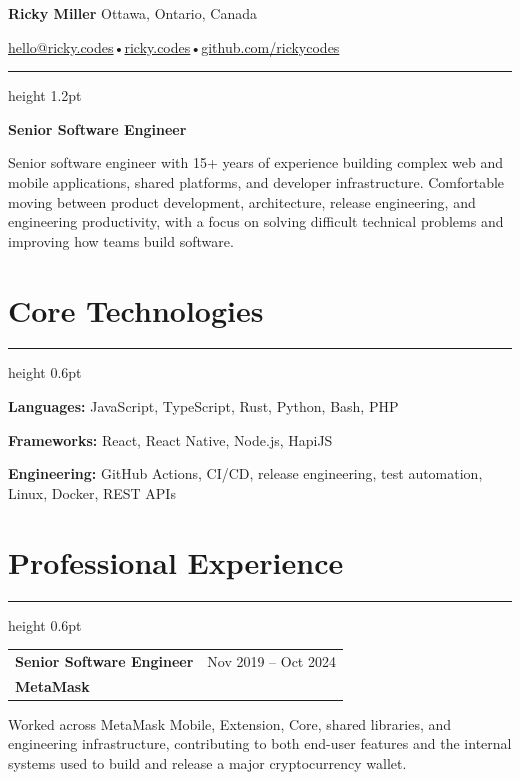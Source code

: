 \documentclass[10pt,letterpaper]{article}
\makeatletter
\newcommand{\headingfont}{\plexmono}
\newcommand{\sectionrule}{\vspace{1pt}\color{rule}\hrule height 0.6pt\color{ink}\vspace{5pt}}
\newcommand{\role}[3]{%
  \begin{tabularx}{\textwidth}{@{}X r@{}}
    {\headingfont\bfseries\large #1} & {\headingfont\small\color{muted} #3}\\[-1pt]
    {\headingfont\bfseries\color{tealink} #2} &
  \end{tabularx}\vspace{0.5pt}
}
\makeatother
\begin{document}
{\headingfont\bfseries\fontsize{25}{27}\selectfont Ricky Miller}\hfill
{\headingfont\small\color{muted} Ottawa, Ontario, Canada}

\vspace{2pt}
{\headingfont\small
\href{mailto:hello@ricky.codes}{hello@ricky.codes}\quad\textcolor{tealink}{•}\quad\href{https://ricky.codes}{ricky.codes}\quad\textcolor{tealink}{•}\quad\href{https://github.com/rickycodes}{github.com/rickycodes}}

\vspace{6pt}
{\color{tealink}\hrule height 1.2pt}
\vspace{7pt}

{\headingfont\bfseries\fontsize{14}{16}\selectfont Senior Software Engineer}

Senior software engineer with 15+ years of experience building complex web and mobile applications, shared platforms, and developer infrastructure. Comfortable moving between product development, architecture, release engineering, and engineering productivity, with a focus on solving difficult technical problems and improving how teams build software.

\section{Core Technologies}

\sectionrule

\textbf{Languages:} JavaScript, TypeScript, Rust, Python, Bash, PHP

\textbf{Frameworks:} React, React Native, Node.js, HapiJS

\textbf{Engineering:} GitHub Actions, CI/CD, release engineering, test automation, Linux, Docker, REST APIs

\section{Professional Experience}

\sectionrule

\role{Senior Software Engineer}{MetaMask}{Nov 2019 -- Oct 2024}

Worked across MetaMask Mobile, Extension, Core, shared libraries, and engineering infrastructure, contributing to both end-user features and the internal systems used to build and release a major cryptocurrency wallet.
\end{document}
